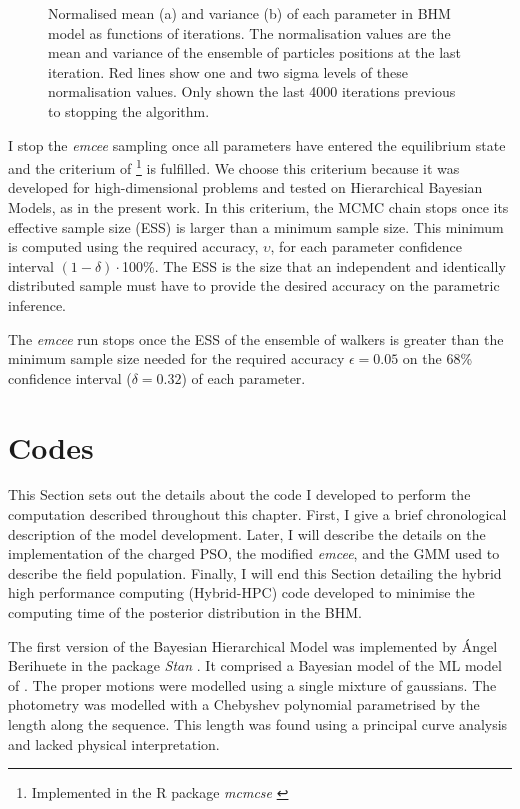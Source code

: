 \begin{figure}[H]
\begin{subfigure}[t]{0.45\textwidth}
        \caption{}
        \label{} 
    \end{subfigure}
\caption{Normalised mean (a) and variance (b) of each parameter in BHM model as functions of iterations. The normalisation values are the mean and variance of the ensemble of particles positions at the last iteration. Red lines show one and two sigma levels of these normalisation values. Only shown the last 4000 iterations previous to stopping the algorithm.}
\label{fig:convergence}
\end{figure}


I stop the \emph{emcee} sampling once all parameters have entered the equilibrium state and the criterium of \citet{Gong2016} \footnote{Implemented in the R package \emph{mcmcse} \citep{mcmcse}} is fulfilled. We choose this criterium because it was developed for high-dimensional problems and tested on Hierarchical Bayesian Models, as in the present work. In this criterium, the MCMC chain stops once its effective sample size (ESS) is larger than a minimum sample size. This minimum is computed using the required accuracy, $\upsilon$, for each parameter confidence interval $(1-\delta)\cdot$100\%. The ESS is the size that an independent and identically distributed sample must have to provide the desired accuracy on the parametric inference. 

The \emph{emcee} run stops once the ESS of the ensemble of walkers is greater than the minimum sample size needed for the required accuracy $\epsilon = 0.05$ on the 68\% confidence interval ($\delta = 0.32$) of each parameter.


\section{Codes}
\label{sect:code}
This Section sets out the details about the code I developed to perform the computation described throughout this chapter. First, I give a brief chronological description of the model development. Later, I will describe the details on the implementation of the charged PSO, the modified \emph{emcee}, and the GMM used to describe the field population. Finally, I will end this Section detailing the hybrid high performance computing (Hybrid-HPC) code developed to minimise the computing time of the posterior distribution in the BHM.

The first version of the Bayesian Hierarchical Model was implemented by \'Angel Berihuete in the package \emph{Stan} \citep{Stan}. It comprised a Bayesian model of the ML model of \citet{Sarro2014}. The proper motions were modelled using a single mixture of gaussians. The photometry was modelled with a Chebyshev polynomial parametrised by the length along the sequence. This length was found using a principal curve analysis and lacked physical interpretation.

